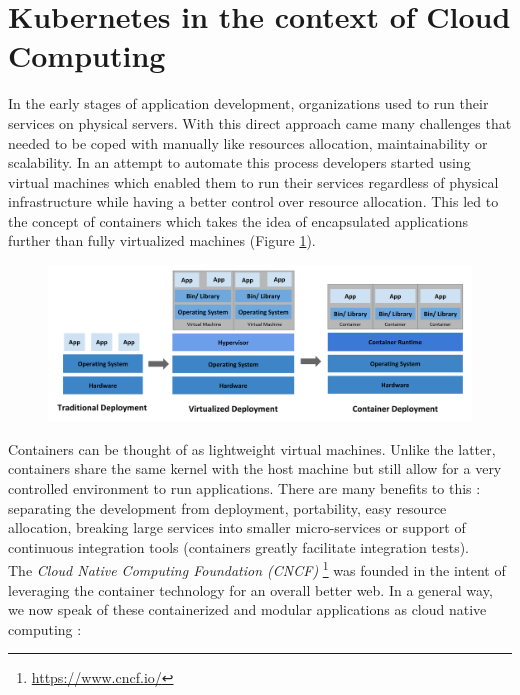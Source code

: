 \section{Kubernetes in the context of Cloud Computing}

In the early stages of application development, organizations used to run their
services on physical servers. With this direct approach came many challenges
that needed to be coped with manually like resources allocation,
maintainability or scalability. In an attempt to automate this process
developers started using virtual machines which enabled them to run their
services regardless of physical infrastructure while having a better control
over resource allocation.  This led to the concept of containers which takes
the idea of encapsulated applications further than fully virtualized machines
(Figure \ref{fig:container-evolution}).

\begin{figure}[h]
	\centering
	\includegraphics[width=\textwidth]{./imgs/container_evolution.png}
	\label{fig:container-evolution}
\end{figure}

Containers can be thought of as lightweight virtual machines. Unlike the
latter, containers share the same kernel with the host machine but still allow
for a very controlled environment to run applications. There are many
benefits to this : separating the development from deployment, portability,
easy resource allocation, breaking large services into smaller micro-services
or support of continuous integration tools (containers greatly facilitate
integration tests).\\

The \textit{Cloud Native Computing Foundation (CNCF)
}\footnote{\url{https://www.cncf.io/}} was founded in the intent of leveraging
the container technology for an overall better web. In a general way, we now
speak of these containerized and modular applications as cloud native computing
:

